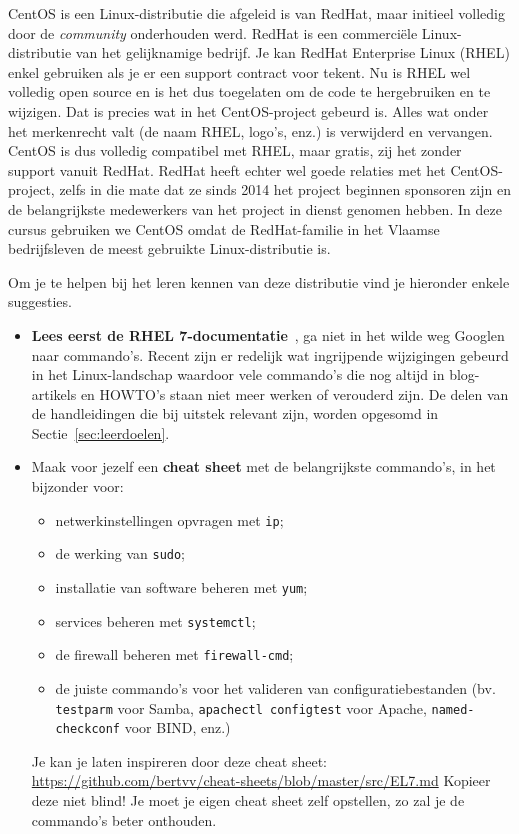 CentOS is een Linux-distributie die afgeleid is van RedHat, maar initieel volledig door de \emph{community} onderhouden werd. RedHat is een commerciële Linux-distributie van het gelijknamige bedrijf. Je kan RedHat Enterprise Linux (RHEL) enkel gebruiken als je er een support contract voor tekent. Nu is RHEL wel volledig open source en is het dus toegelaten om de code te hergebruiken en te wijzigen. Dat is precies wat in het CentOS-project gebeurd is. Alles wat onder het merkenrecht valt (de naam RHEL, logo's, enz.) is verwijderd en vervangen. CentOS is dus volledig compatibel met RHEL, maar gratis, zij het zonder support vanuit RedHat. RedHat heeft echter wel goede relaties met het CentOS-project, zelfs in die mate dat ze sinds 2014 het project beginnen sponsoren zijn en de belangrijkste medewerkers van het project in dienst genomen hebben. In deze cursus gebruiken we CentOS omdat de RedHat-familie in het Vlaamse bedrijfsleven de meest gebruikte Linux-distributie is.

Om je te helpen bij het leren kennen van deze distributie vind je hieronder enkele suggesties.

\begin{itemize}
  \item \textbf{Lees eerst de RHEL 7-documentatie}~\autocite{SvistunovEtAl2016,JahodaEtAl2016,JahodaEtAl2016a}, ga niet in het wilde weg Googlen naar commando's. Recent zijn er redelijk wat ingrijpende wijzigingen gebeurd in het Linux-landschap waardoor vele commando's die nog altijd in blog-artikels en HOWTO's staan niet meer werken of verouderd zijn. De delen van de handleidingen die bij uitstek relevant zijn, worden opgesomd in Sectie~\ref{sec:leerdoelen}.
  \item Maak voor jezelf een \textbf{cheat sheet} met de belangrijkste commando's, in het bijzonder voor:
    \begin{itemize}
      \item netwerkinstellingen opvragen met \texttt{ip};
      \item de werking van \texttt{sudo};
      \item installatie van software beheren met \texttt{yum};
      \item services beheren met \texttt{systemctl};
      \item de firewall beheren met \texttt{firewall-cmd};
      \item de juiste commando's voor het valideren van configuratiebestanden (bv. \texttt{testparm} voor Samba, \texttt{apachectl configtest} voor Apache, \texttt{named-checkconf} voor BIND, enz.)
    \end{itemize}

    Je kan je laten inspireren door deze cheat sheet: \url{https://github.com/bertvv/cheat-sheets/blob/master/src/EL7.md} Kopieer deze niet blind! Je moet je eigen cheat sheet zelf opstellen, zo zal je de commando's beter onthouden.
\end{itemize}

